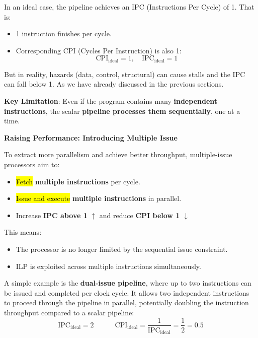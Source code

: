 \noindent
In an ideal case, the pipeline achieves an IPC (Instructions Per Cycle) of 1. That is:
\begin{itemize}
    \item 1 instruction finishes per cycle.
    \item Corresponding CPI (Cycles Per Instruction) is also 1:
    \begin{equation*}
        \text{CPI}_{\text{ideal}} = 1,\quad \text{IPC}_{\text{ideal}} = 1
    \end{equation*}
\end{itemize}
But in reality, hazards (data, control, structural) can cause stalls and the IPC can fall below 1. As we have already discussed in the previous sections.

\highspace
\textcolor{Red2}{ \textbf{Key Limitation}}: Even if the program contains many \textbf{independent instructions}, the scalar \textbf{pipeline processes them sequentially}, one at a time.

\highspace
\begin{flushleft}
    \textcolor{Green3}{\faIcon{\speedIcon} \textbf{Raising Performance: Introducing Multiple Issue}}
\end{flushleft}
To extract more parallelism and achieve better throughput, multiple-issue processors aim to:
\begin{itemize}
    \item \hl{Fetch} \textbf{multiple instructions} per cycle.
    \item \hl{Issue and execute} \textbf{multiple instructions} in parallel.
    \item Increase \textbf{IPC above 1} $\uparrow$ and reduce \textbf{CPI below 1} $\downarrow$
\end{itemize}
This means:
\begin{itemize}
    \item The processor is no longer limited by the sequential issue constraint.
    \item ILP is exploited across multiple instructions simultaneously.
\end{itemize}
A simple example is the \textbf{dual-issue pipeline}, where up to two instructions can be issued and completed per clock cycle. It allows two independent instructions to proceed through the pipeline in parallel, potentially doubling the instruction throughput compared to a scalar pipeline:
\begin{equation*}
    \text{IPC}_{\text{ideal}} = 2 \hspace{3em} \text{CPI}_{\text{ideal}} = \dfrac{1}{\text{IPC}_{\text{ideal}}} = \dfrac{1}{2} = 0.5
\end{equation*}

